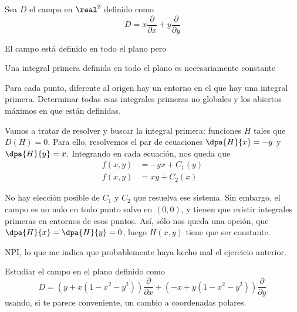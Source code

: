 \begin{problem}[2]
Sea $D$ el campo en $\real^2$ definido como
\[D=x \frac{\partial}{\partial x}+y \frac{\partial}{\partial y }\]

El campo está definido en todo el plano pero

\ppart Una integral primera definida en todo el plano es necesariamente constante

\ppart Para cada punto, diferente al origen hay un entorno en el que hay una integral primera. Determinar todas esas integrales primeras no globales y los abiertos máximos en que están definidas.
\solution

\spart
Vamos a tratar de resolver y buscar la integral primera: funciones $H$ tales que $D(H) = 0$. Para ello, resolvemos el par de ecuaciones $\dpa{H}{x} = -y$ y $\dpa{H}{y} = x$. Integrando en cada ecuación, nos queda que \begin{align*}
f(x,y) &= -yx + C_1(y) \\
f(x,y) &= xy + C_2(x)
\end{align*}

No hay elección posible de $C_1$ y $C_2$ que resuelva ese sistema. Sin embargo, el campo es no nulo en todo punto salvo en $(0,0)$, y tienen que existir integrales primeras en entornos de esos puntos. Así, sólo nos queda una opción, que $\dpa{H}{x} = \dpa{H}{y} = 0$, luego $H(x,y)$ tiene que ser constante.

\spart NPI, lo que me indica que probablemente haya hecho mal el ejercicio anterior.

\end{problem}

\begin{problem}[3]
Estudiar el campo en el plano definido como
\[D=(y+x(1-x^2-y^2))\frac{\partial}{\partial x} + (-x+y(1-x^2-y^2))\frac{\partial}{\partial y}\]
usando, si te parece conveniente, un cambio a coordenadas polares.
\solution

\end{problem}
